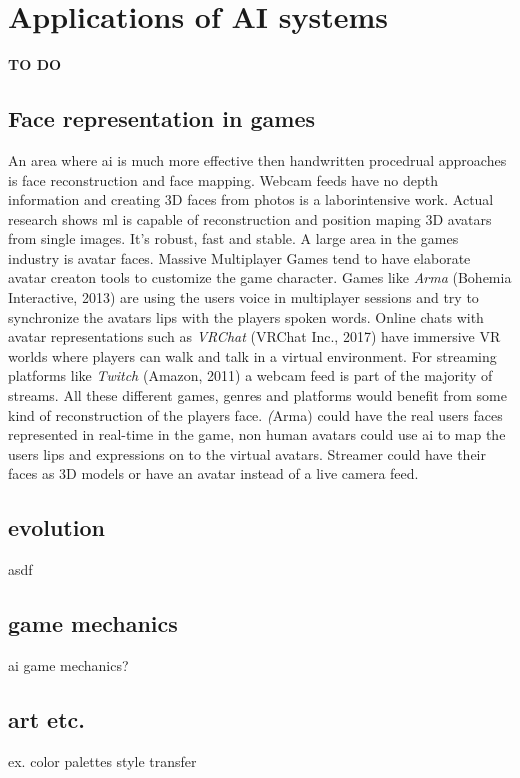 \documentclass[10pt,a4paper]{article}
\begin{document}
\section{Applications of AI systems}
\textbf{TO DO}

\subsection{Face representation in games}
An area where \gls{ai} is much more effective then handwritten procedrual approaches is face reconstruction and face mapping. Webcam feeds have no depth information and creating 3D faces from photos is a laborintensive work. Actual research shows \gls{ml} is capable of reconstruction and position maping 3D avatars from single images. It's robust, fast and stable\cite{Feng2018}. A large area in the games industry is avatar faces. Massive Multiplayer Games tend to have elaborate avatar creaton tools to customize the game character. Games like \textit{Arma} (Bohemia Interactive, 2013) are using the users voice in multiplayer sessions and try to synchronize the avatars lips with the players spoken words. Online chats with avatar representations such as \textit{VRChat} (VRChat Inc., 2017) have immersive VR worlds where players can walk and talk in a virtual environment. For streaming platforms like \textit{Twitch} (Amazon, 2011) a webcam feed is part of the majority of streams. All these different games, genres and platforms would benefit from some kind of reconstruction of the players face. \textit(Arma) could have the real users faces represented in real-time in the game, non human avatars could use \gls{ai} to map the users lips and expressions on to the virtual avatars. Streamer could have their faces as 3D models or have an avatar instead of a live camera feed.

\subsection{evolution}
asdf

\subsection{game mechanics}
ai game mechanics?

\subsection{art etc.}
ex. color palettes
style transfer
\end{document}
